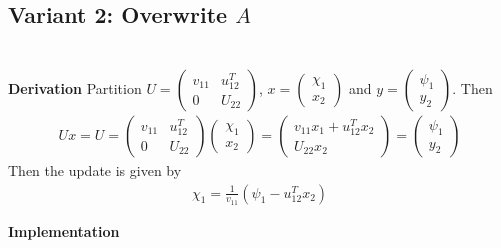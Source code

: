\documentclass[11pt,a4paper]{article}
\begin{document}
\subsection{Variant 2: Overwrite $A$}


\newpage
\setcounter{section}{12}
\section{}
{\bf Derivation}
Partition 
$U=\left(\begin{array}{c|c} v_{11}& u_{12}^T \\\hline 0 & U_{22} \end{array}\right)$,
$x = \left( \begin{array}{c} \chi_1 \\\hline x_2 \end{array} \right)$ and 
$y = \left( \begin{array}{c} \psi_1 \\\hline y_2 \end{array} \right)$. Then
\begin{align}
    Ux = 
    U=\left(\begin{array}{c|c} v_{11}& u_{12}^T \\\hline 0 & U_{22} \end{array}\right)
    \left( \begin{array}{c} \chi_1 \\\hline x_2 \end{array} \right) 
    = 
    \left( \begin{array}{c} v_{11}x_1 + u_{12}^T x_2 \\\hline U_{22} x_2 \end{array} \right) 
    =
    \left( \begin{array}{c} \psi_1 \\\hline y_2 \end{array} \right)
\end{align}
Then the update is given by
\begin{align}
    \chi_1 = \frac{1}{v_{11}}(\psi_1 - u_{12}^T x_2)
\end{align}


\noindent
{\bf Implementation}


\newpage
\setcounter{section}{13}
\end{document}
